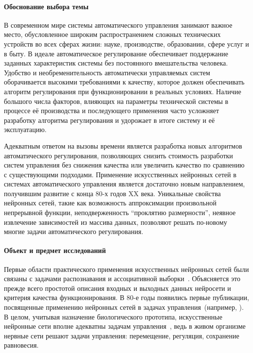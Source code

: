 
\paragraph{Обоснование выбора темы}

В современном мире системы автоматического управления занимают важное
место, обусловленное широким распространением сложных технических
устройств во всех сферах жизни: науке, производстве, образовании,
сфере услуг и в быту.  В идеале автоматическое регулирование
обеспечивает поддержание заданных характеристик системы без
постоянного вмешательства человека.  Удобство и необременительность
автоматически управляемых систем оборачивается высокими требованиями к
качеству, которое должен обеспечивать алгоритм регулирования при
функционировании в реальных условиях.  Наличие большого числа
факторов, влияющих на параметры технической системы в процессе её
производства и последующего применения часто усложняет разработку
алгоритма регулирования и удорожает в итоге систему и её эксплуатацию.

Адекватным ответом на вызовы времени является разработка новых
алгоритмов автоматического регулирования, позволяющих снизить
стоимость разработки систем управления без снижения качества или
увеличить качество по сравнению с существующими подходами.  Применение
искусственных нейронных сетей в системах автоматического управления
является достаточно новым направлением, получившим развитие с конца
80-х годов XX века.  Уникальные свойства нейронных сетей, такие как
возможность аппроксимации произвольной непрерывной функции,
неподверженность ``проклятию размерности'', неявное извлечение
зависимостей из массива данных, позволяют решать по-новому многие
задачи автоматического регулирования.

\paragraph{Объект и предмет исследований}


Первые области практического применения искусственных нейронных сетей
были связаны с задачами распознавания и ассоциативной
выборки~\cite{wasser92,koh80,gal74}.  Объясняется это прежде всего
простотой описания входных и выходных данных нейросети и критерия
качества функционирования.  В 80-е годы появились первые публикации,
посвященные применению нейронных сетей в задачах управления~(например,
\cite{barto83}).  В целом, учитывая назначение биологического
прототипа, искусственные нейронные сети вполне адекватны задачам
управления~\cite{bondlog97}, ведь в живом организме нервные сети
решают задачи управления: перемещение, регуляция, сохранение
равновесия.

